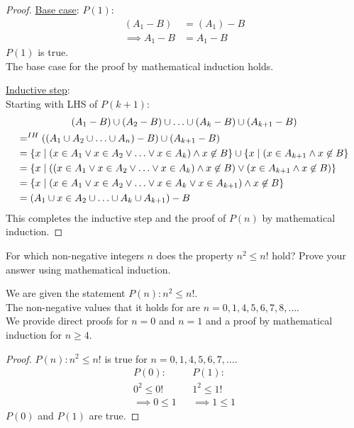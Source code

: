 \documentclass[a4paper]{exam}
\begin{document}
\begin{questions}
\begin{parts}
\begin{solution}
\begin{proof}
      \underline{Base case}: $P(1)$:\\
      \begin{align*}
        (A_1-B) &= (A_1)-B\\
        \implies A_1-B &= A_1-B
        \end{align*}
        $P(1)$ is true.\\
        The base case for the proof by mathematical induction holds.

      \underline{Inductive step}:\\
        Starting with LHS of $P(k+1)$:
          \begin{multline*}
          (A_1-B)\cup(A_2-B)\cup\ldots\cup(A_k-B)\cup(A_{k+1}-B)\\
          =^{IH} ((A_1\cup A_2\cup\ldots \cup A_n)-B) \cup(A_{k+1}-B)\hfill\\
          = \{ x\mid (x\in A_1 \lor x\in A_2 \lor\ldots\lor x\in A_k) \land x\not\in B\} \cup\{ x\mid (x\in A_{k+1} \land x\not\in B\}\hfill \\
          = \{ x\mid ((x\in A_1 \lor x\in A_2 \lor\ldots\lor x\in A_k) \land x\not\in B)\lor (x\in A_{k+1} \land x\not\in B)\}\hfill \\
          = \{ x\mid (x\in A_1 \lor x\in A_2 \lor\ldots\lor x\in A_k\lor x\in A_{k+1}) \land x\not\in B\}\hfill \\
          = (A_1 \cup x\in A_2 \cup\ldots\cup A_k\cup A_{k+1}) - B \hfill
        \end{multline*}
        This completes the inductive step and the proof of $P(n)$ by mathematical induction.
      \end{proof}
    \end{solution}
  \end{parts}

\question For which non-negative integers $n$ does the property $n^2 \le n!$ hold? Prove your answer using mathematical induction.
  \begin{solution}
    We are given the statement $P(n): n^2\le n!$.\\
    The non-negative values that it holds for are $n = 0, 1, 4, 5, 6, 7, 8, \ldots$.\\
    We provide direct proofs for $n=0$ and $n=1$ and a proof by mathematical induction for $n\ge 4$.

    \begin{proof} $P(n): n^2\le n!$ is true for $n=0,1,4,5,6,7,\ldots$.
      \begin{align*}
        P(0): & & P(1):\\
        0^2  \le 0! && 1^2 \le 1!\\
        \implies 0  \le 1 && \implies 1 \le 1
      \end{align*}
      $P(0)$ and $P(1)$ are true.


\end{proof}
\end{solution}
\end{questions}
\end{document}
